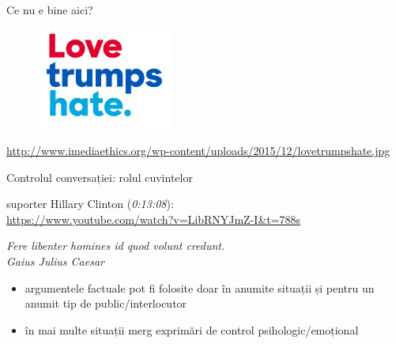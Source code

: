 \documentclass{simple}
\begin{document}
\begin{frame}{Ce nu e bine aici?}
  \begin{figure}
    \centering
    \includegraphics[width=0.4\textwidth]{img/love-trumps-hate}
  \end{figure}
  \begin{center}
    \tiny
    \url{http://www.imediaethics.org/wp-content/uploads/2015/12/lovetrumpshate.jpg}
  \end{center}
\end{frame}

\begin{frame}{Controlul conversației: rolul cuvintelor}
  \begin{center}
    \scriptsize
    suporter Hillary Clinton (\textit{0:13:08}):\\
    \url{https://www.youtube.com/watch?v=LibRNYJmZ-I&t=788s}\\
  \end{center}
  \pause
  \vspace{5mm}
  \begin{center}
    \textit{Fere libenter homines id quod volunt credunt.}\\
    \vspace{3mm}
    \hfill \textit{Gaius Julius Caesar}\\
    \vspace{5mm}
  \end{center}
  \begin{itemize}
    \pause
    \item argumentele factuale pot fi folosite doar în anumite situații și pentru un anumit tip de public/interlocutor
    \pause
    \item în mai multe situații merg exprimări de control psihologic/emoțional
  \end{itemize}
\end{frame}
\end{document}
